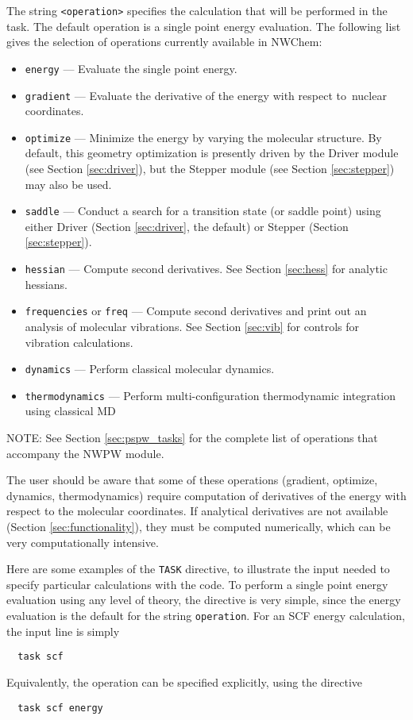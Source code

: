 The string \verb+<operation>+ specifies the calculation that will
be performed in the task.  The default operation is a single point energy
evaluation.  The following list gives the selection of operations currently
available in NWChem:
\begin{itemize}
\item \verb+energy+ --- Evaluate the single point energy.
\item \verb+gradient+ --- Evaluate the derivative of the energy with respect to\
   nuclear coordinates.
\item \verb+optimize+ --- Minimize the energy by varying the molecular
   structure.  By default, this geometry optimization is presently driven by the Driver
   module (see Section \ref{sec:driver}), but the Stepper module
   (see Section \ref{sec:stepper}) may also be used.
\item \verb+saddle+ --- Conduct a search for a transition state (or saddle point) 
  using either Driver (Section \ref{sec:driver}, the default) or
  Stepper (Section \ref{sec:stepper}).
\item \verb+hessian+ --- Compute second derivatives.  See Section \ref{sec:hess}
  for analytic hessians.
\item \verb+frequencies+ or \verb+freq+ --- Compute second derivatives 
  and print out an analysis of molecular vibrations.  See Section \ref{sec:vib}
  for controls for vibration calculations.
\item \verb+dynamics+ --- Perform classical molecular dynamics.
\item \verb+thermodynamics+ --- Perform multi-con\-fig\-ura\-tion
  thermo\-dynamic integ\-ration using classical MD
\end{itemize}

NOTE: See Section \ref{sec:pspw_tasks}  for the complete list of operations
that accompany the NWPW module.

The user should be aware that some of these operations (gradient,
optimize, dynamics, thermodynamics) require computation of
derivatives of the energy with respect to the molecular coordinates.
If analytical derivatives are not available (Section
\ref{sec:functionality}), they must be computed numerically, which can
be very computationally intensive.

Here are some examples of the \verb+TASK+ directive, to illustrate the
input needed to specify particular calculations with the code.  To
perform a single point energy evaluation using any level of theory, the
directive is very simple, since the energy evaluation is the default
for the string \verb+operation+.  For an SCF energy calculation, the
input line is simply
\begin{verbatim}
  task scf
\end{verbatim}
Equivalently, the operation can be specified explicitly, using the
directive
\begin{verbatim}
  task scf energy
\end{verbatim}

